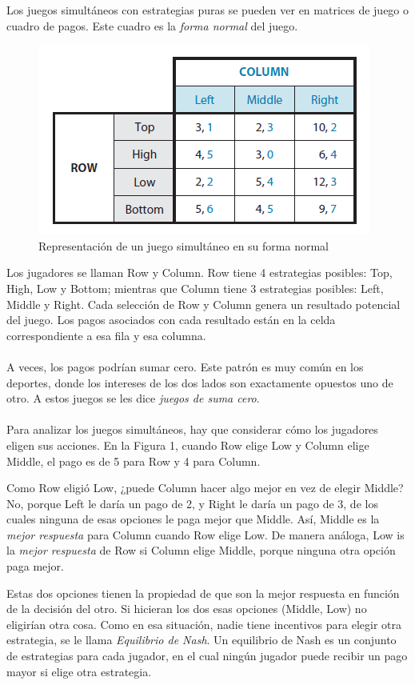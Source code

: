 \documentclass{article}
\begin{document}
        Los juegos simultáneos con estrategias puras se pueden ver en matrices de juego o cuadro de pagos. Este cuadro es la \emph{forma normal} del juego.

        \begin{figure}
            \centering
            \includegraphics[width=0.5\linewidth]{figs/fig9.PNG}
            \caption{Representación de un juego simultáneo en su forma normal}
            \label{fig:enter-label}
        \end{figure}

        Los jugadores se llaman Row y Column. Row tiene 4 estrategias posibles: Top, High, Low y Bottom; mientras que Column tiene 3 estrategias posibles: Left, Middle y Right. Cada selección de Row y Column genera un resultado potencial del juego. Los pagos asociados con cada resultado están en la celda correspondiente a esa fila y esa columna.
        \\
        \\
        A veces, los pagos podrían sumar cero. Este patrón es muy común en los deportes, donde los intereses de los dos lados son exactamente opuestos uno de otro. A estos juegos se les dice \emph{juegos de suma cero}.
        \\
        \\
        Para analizar los juegos simultáneos, hay que considerar cómo los jugadores eligen sus acciones. En la Figura 1, cuando Row elige Low y Column elige Middle, el pago es de 5 para Row y 4 para Column.

        Como Row eligió Low, ¿puede Column hacer algo mejor en vez de elegir Middle? No, porque Left le daría un pago de 2, y Right le daría un pago de 3, de los cuales ninguna de esas opciones le paga mejor que Middle. Así, Middle es la \emph{mejor respuesta} para Column cuando Row elige Low. De manera análoga, Low is la \emph{mejor respuesta} de Row si Column elige Middle, porque ninguna otra opción paga mejor.

        Estas dos opciones tienen la propiedad de que son la mejor respuesta en función de la decisión del otro. Si hicieran los dos esas opciones (Middle, Low) no eligirían otra cosa. Como en esa situación, nadie tiene incentivos para elegir otra estrategia, se le llama \emph{Equilibrio de Nash}. Un equilibrio de Nash es un conjunto de estrategias para cada jugador, en el cual ningún jugador puede recibir un pago mayor si elige otra estrategia.
    
\end{document}
